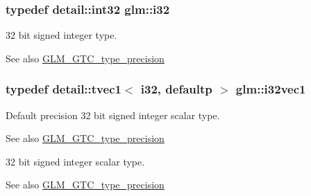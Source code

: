 \subsubsection[{\texorpdfstring{i32}{i32}}]{\setlength{\rightskip}{0pt plus 5cm}typedef detail\+::int32 {\bf glm\+::i32}}\hypertarget{group__gtc__type__precision_ga1d8ed5c43e91ea7d4528389da4fa9524}{}\label{group__gtc__type__precision_ga1d8ed5c43e91ea7d4528389da4fa9524}
32 bit signed integer type. \begin{DoxySeeAlso}{See also}
\hyperlink{group__gtc__type__precision}{G\+L\+M\+\_\+\+G\+T\+C\+\_\+type\+\_\+precision} 
\end{DoxySeeAlso}
\subsubsection[{\texorpdfstring{i32vec1}{i32vec1}}]{\setlength{\rightskip}{0pt plus 5cm}typedef detail\+::tvec1$<$ i32, defaultp $>$ {\bf glm\+::i32vec1}}\hypertarget{group__gtc__type__precision_ga0d3741d44591183f3dee9500b4ad9ab4}{}\label{group__gtc__type__precision_ga0d3741d44591183f3dee9500b4ad9ab4}
Default precision 32 bit signed integer scalar type. \begin{DoxySeeAlso}{See also}
\hyperlink{group__gtc__type__precision}{G\+L\+M\+\_\+\+G\+T\+C\+\_\+type\+\_\+precision}
\end{DoxySeeAlso}
32 bit signed integer scalar type. \begin{DoxySeeAlso}{See also}
\hyperlink{group__gtc__type__precision}{G\+L\+M\+\_\+\+G\+T\+C\+\_\+type\+\_\+precision} 
\end{DoxySeeAlso}

